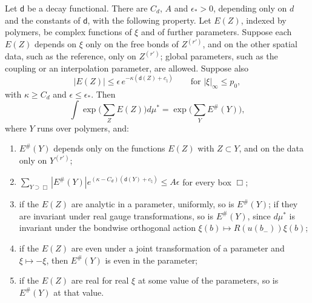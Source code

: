 \begin{theorem}\label{thm:mayer}
Let $\mathsf d$ be a decay functional. There are $C_d$, $A$ and $\epsilon_*>0$, depending only on $d$ and the constants of $\mathsf d$, with the following property. Let $E(Z)$, indexed by polymers, be complex functions of $\xi$ and of further parameters. Suppose each $E(Z)$ depends on $\xi$ only on the free bonds of $Z^{(r')}$, and on the other spatial data, such as the reference, only on $Z^{(r')}$; global parameters, such as the coupling or an interpolation parameter, are allowed. Suppose also
\[
|E(Z)|\le\epsilon\,e^{-\kappa(\mathsf d(Z)+c_\natural)}\qquad\text{for }|\xi|_\infty\le p_0,
\]
with $\kappa\ge C_d$ and $\epsilon\le\epsilon_*$. Then
\[
\int\exp\Big(\sum_ZE(Z)\Big)d\mu^*=\exp\Big(\sum_YE^\#(Y)\Big),
\]
where $Y$ runs over polymers, and:
\begin{enumerate}[label=(\alph*)]
\item $E^\#(Y)$ depends only on the functions $E(Z)$ with $Z\subset Y$, and on the data only on $Y^{(r')}$;
\item $\sum_{Y\supset\Box}|E^\#(Y)|e^{(\kappa-C_d)(\mathsf d(Y)+c_\natural)}\le A\epsilon$ for every box $\Box$;
\item if the $E(Z)$ are analytic in a parameter, uniformly, so is $E^\#(Y)$; if they are invariant under real gauge transformations, so is $E^\#(Y)$, since $d\mu^*$ is invariant under the bondwise orthogonal action $\xi(b)\mapsto R(u(b_-))\xi(b)$;
\item if the $E(Z)$ are even under a joint transformation of a parameter and $\xi\mapsto-\xi$, then $E^\#(Y)$ is even in the parameter;
\item if the $E(Z)$ are real for real $\xi$ at some value of the parameters, so is $E^\#(Y)$ at that value.
\end{enumerate}
\end{theorem}

